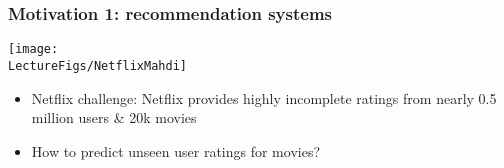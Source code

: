 \documentclass[compress,
mathserif,wide,%
]{beamer}
\begin{document}
\begin{frame}

	


\end{frame}





\begin{frame}
  \frametitle{Motivation 1: recommendation systems}

\begin{center}
  \begin{center}
\texttt{[image: \\LectureFigs/NetflixMahdi]} \\
\end{center} 

\vspace{1em}
\begin{itemize}
  \itemsep0.3em
  \item Netflix challenge: Netflix provides highly incomplete ratings from nearly 0.5 million users \& 20k movies
  \item How to predict unseen user ratings for movies?
\end{itemize}
\end{center}
\end{frame}
\end{document}
